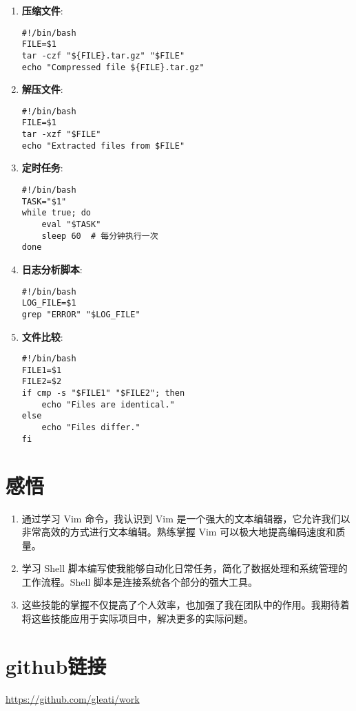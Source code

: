 \documentclass{ctexart}
\begin{document}
\begin{enumerate}[label=\arabic*.]
\item \textbf{压缩文件}:
\begin{lstlisting}
#!/bin/bash
FILE=$1
tar -czf "${FILE}.tar.gz" "$FILE"
echo "Compressed file ${FILE}.tar.gz"
\end{lstlisting}

\item \textbf{解压文件}:
\begin{lstlisting}
#!/bin/bash
FILE=$1
tar -xzf "$FILE"
echo "Extracted files from $FILE"
\end{lstlisting}

\item \textbf{定时任务}:
\begin{lstlisting}
#!/bin/bash
TASK="$1"
while true; do
    eval "$TASK"
    sleep 60  # 每分钟执行一次
done
\end{lstlisting}

\item \textbf{日志分析脚本}:
\begin{lstlisting}
#!/bin/bash
LOG_FILE=$1
grep "ERROR" "$LOG_FILE"
\end{lstlisting}

\item \textbf{文件比较}:
\begin{lstlisting}
#!/bin/bash
FILE1=$1
FILE2=$2
if cmp -s "$FILE1" "$FILE2"; then
    echo "Files are identical."
else
    echo "Files differ."
fi
\end{lstlisting}
\end{enumerate}

\section{感悟}
\begin{enumerate}
    \item 通过学习 Vim 命令，我认识到 Vim 是一个强大的文本编辑器，它允许我们以非常高效的方式进行文本编辑。熟练掌握 Vim 可以极大地提高编码速度和质量。
    \item 学习 Shell 脚本编写使我能够自动化日常任务，简化了数据处理和系统管理的工作流程。Shell 脚本是连接系统各个部分的强大工具。
    \item 这些技能的掌握不仅提高了个人效率，也加强了我在团队中的作用。我期待着将这些技能应用于实际项目中，解决更多的实际问题。
\end{enumerate}

\section{github链接}
\url{https://github.com/gleati/work}
\end{document}
